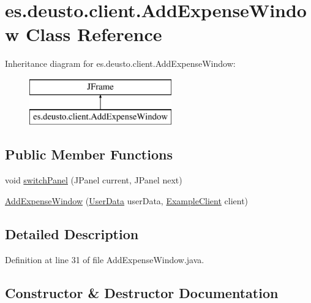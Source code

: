\hypertarget{classes_1_1deusto_1_1client_1_1_add_expense_window}{}\section{es.\+deusto.\+client.\+Add\+Expense\+Window Class Reference}
\label{classes_1_1deusto_1_1client_1_1_add_expense_window}
Inheritance diagram for es.\+deusto.\+client.\+Add\+Expense\+Window\+:\begin{figure}[H]
\begin{center}
\leavevmode
\includegraphics[height=2.000000cm]{classes_1_1deusto_1_1client_1_1_add_expense_window}
\end{center}
\end{figure}
\subsection*{Public Member Functions}
\begin{DoxyCompactItemize}
\item 
void \hyperlink{classes_1_1deusto_1_1client_1_1_add_expense_window_a6240f4fbc81e74662e2b811e20768e9a}{switch\+Panel} (J\+Panel current, J\+Panel next)
\item 
\hyperlink{classes_1_1deusto_1_1client_1_1_add_expense_window_a02db23fc03228f06fef302c1df129b27}{Add\+Expense\+Window} (\hyperlink{classes_1_1deusto_1_1serialization_1_1_user_data}{User\+Data} user\+Data, \hyperlink{classes_1_1deusto_1_1client_1_1_example_client}{Example\+Client} client)
\end{DoxyCompactItemize}


\subsection{Detailed Description}


Definition at line 31 of file Add\+Expense\+Window.\+java.



\subsection{Constructor \& Destructor Documentation}
\mbox{\label{classes_1_1deusto_1_1client_1_1_add_expense_window_a02db23fc03228f06fef302c1df129b27}} 
